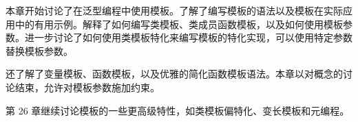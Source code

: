 本章开始讨论了在泛型编程中使用模板。了解了编写模板的语法以及模板在实际应用中的有用示例。解释了如何编写类模板、类成员函数模板，以及如何使用模板参数。进一步讨论了如何使用类模板特化来编写模板的特化实现，可以使用特定参数替换模板参数。

还了解了变量模板、函数模板，以及优雅的简化函数模板语法。本章以对概念的讨论结束，允许对模板参数施加约束。

第 26 章继续讨论模板的一些更高级特性，如类模板偏特化、变长模板和元编程。
